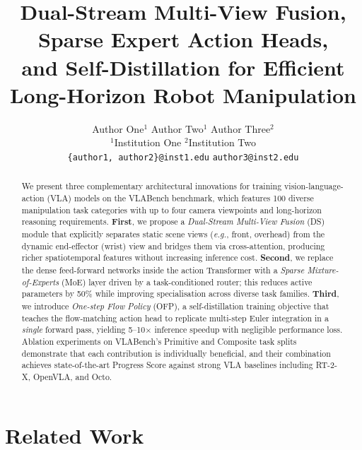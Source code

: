 \documentclass[10pt,twocolumn]{article}
\title{\textbf{Dual-Stream Multi-View Fusion, Sparse Expert Action Heads,\\
and Self-Distillation for Efficient Long-Horizon Robot Manipulation}}
\author{
  Author One$^{1}$ \quad Author Two$^{1}$ \quad Author Three$^{2}$ \\
  $^{1}$Institution One \quad $^{2}$Institution Two \\
  \texttt{\{author1, author2\}@inst1.edu} \quad \texttt{author3@inst2.edu}
}
\date{}
\newcommand{\eg}{\textit{e.g.}}
\begin{document}
\maketitle

\begin{abstract}
We present three complementary architectural innovations for training
vision-language-action (VLA) models on the VLABench benchmark, which features
100 diverse manipulation task categories with up to four camera viewpoints and
long-horizon reasoning requirements.
%
\textbf{First}, we propose a \emph{Dual-Stream Multi-View Fusion} (DS) module
that explicitly separates static scene views (\eg, front, overhead) from the
dynamic end-effector (wrist) view and bridges them via cross-attention,
producing richer spatiotemporal features without increasing inference cost.
%
\textbf{Second}, we replace the dense feed-forward networks inside the action
Transformer with a \emph{Sparse Mixture-of-Experts} (MoE) layer driven by a
task-conditioned router; this reduces active parameters by 50\% while improving
specialisation across diverse task families.
%
\textbf{Third}, we introduce \emph{One-step Flow Policy} (OFP), a
self-distillation training objective that teaches the flow-matching action head
to replicate multi-step Euler integration in a \emph{single} forward pass,
yielding 5--10$\times$ inference speedup with negligible performance loss.
%
Ablation experiments on VLABench's Primitive and Composite task splits
demonstrate that each contribution is individually beneficial, and their
combination achieves state-of-the-art Progress Score against strong VLA
baselines including RT-2-X, OpenVLA, and Octo.

\end{abstract}


\section{Related Work}
\label{sec:related}
\end{document}
